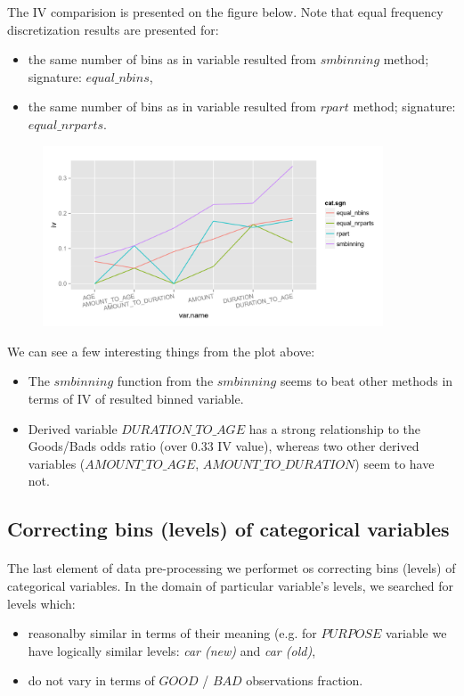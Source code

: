 \documentclass[10pt]{article}\usepackage[]{graphicx}\usepackage[]{color}
\begin{document}
The IV comparision is presented on the figure below. Note that equal frequency discretization results are presented for:
\begin{itemize}
\item the same number of bins as in variable resulted from $smbinning$ method; signature: $equal\_nbins$,
\item the same number of bins as in variable resulted from $rpart$ method; signature: $equal\_nrparts$.
\end{itemize}

\begin{figure}[h!]
\centering
\includegraphics[width=0.9\textwidth]{Plots2/snbinning.png}
\end{figure}

We can see a few interesting things from the plot above: 
\begin{itemize}
\item The $smbinning$ function from the $smbinning$ seems to beat other methods in terms of IV of resulted binned variable. 
\item Derived variable $DURATION\_TO\_AGE$ has a strong relationship to the Goods/Bads odds ratio (over 0.33 IV value), whereas two other derived variables ($AMOUNT\_TO\_AGE$, $AMOUNT\_TO\_DURATION$) seem to have not. 
\end{itemize}


\subsection{Correcting bins (levels) of categorical variables}
\paragraph{}
The last element of data pre-processing we performet os correcting bins (levels) of categorical variables. In the domain of particular variable's levels, we searched for levels which: 
\begin{itemize}
\item reasonalby similar in terms of their meaning (e.g. for $PURPOSE$ variable we have logically similar levels: \textit{car (new)} and \textit{car (old)},
\item do not vary in terms of $GOOD$ / $BAD$ observations fraction.
\end{itemize}
\end{document}
